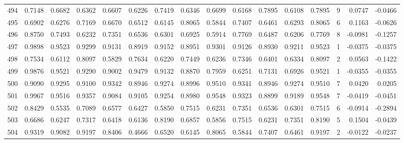 \begin{tabular}{lrrrrrrrrrrrrrrr}
494 &      0.7148 &  0.6682 &  0.6362 &  0.6607 &  0.6226 &  0.7419 &  0.6346 &  0.6699 &  0.6168 &  0.7895 &   0.6108 &     0.7895 &      9 &                    0.0747 &                    -0.0466 \\
495 &      0.6902 &  0.6276 &  0.7169 &  0.6670 &  0.6512 &  0.6145 &  0.8065 &  0.5844 &  0.7407 &  0.6461 &   0.6293 &     0.8065 &      6 &                    0.1163 &                    -0.0626 \\
496 &      0.8750 &  0.7493 &  0.6232 &  0.7351 &  0.6536 &  0.6301 &  0.6925 &  0.5914 &  0.7769 &  0.6487 &   0.6206 &     0.7769 &      8 &                   -0.0981 &                    -0.1257 \\
497 &      0.9898 &  0.9523 &  0.9299 &  0.9131 &  0.8919 &  0.9152 &  0.8951 &  0.9301 &  0.9126 &  0.8930 &   0.9211 &     0.9523 &      1 &                   -0.0375 &                    -0.0375 \\
498 &      0.7534 &  0.6112 &  0.8097 &  0.5829 &  0.7634 &  0.6220 &  0.7449 &  0.6236 &  0.7346 &  0.6401 &   0.6334 &     0.8097 &      2 &                    0.0563 &                    -0.1422 \\
499 &      0.9876 &  0.9521 &  0.9290 &  0.9002 &  0.9479 &  0.9132 &  0.8870 &  0.7959 &  0.6251 &  0.7131 &   0.6926 &     0.9521 &      1 &                   -0.0355 &                    -0.0355 \\
500 &      0.9090 &  0.9295 &  0.9100 &  0.9342 &  0.8946 &  0.9274 &  0.8996 &  0.9510 &  0.9341 &  0.8946 &   0.9274 &     0.9510 &      7 &                    0.0420 &                     0.0205 \\
501 &      0.9967 &  0.9516 &  0.9357 &  0.9084 &  0.9105 &  0.9254 &  0.8980 &  0.9548 &  0.9323 &  0.8899 &   0.9189 &     0.9548 &      7 &                   -0.0419 &                    -0.0451 \\
502 &      0.8429 &  0.5535 &  0.7089 &  0.6577 &  0.6427 &  0.5850 &  0.7515 &  0.6231 &  0.7351 &  0.6536 &   0.6301 &     0.7515 &      6 &                   -0.0914 &                    -0.2894 \\
503 &      0.6686 &  0.6247 &  0.7317 &  0.6418 &  0.6136 &  0.8190 &  0.6857 &  0.5856 &  0.7515 &  0.6231 &   0.7351 &     0.8190 &      5 &                    0.1504 &                    -0.0439 \\
504 &      0.9319 &  0.9082 &  0.9197 &  0.8406 &  0.4666 &  0.6520 &  0.6145 &  0.8065 &  0.5844 &  0.7407 &   0.6461 &     0.9197 &      2 &                   -0.0122 &                    -0.0237 \\

\end{tabular}
